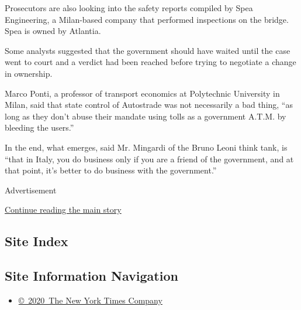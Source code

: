 Prosecutors are also looking into the safety reports compiled by Spea
Engineering, a Milan-based company that performed inspections on the
bridge. Spea is owned by Atlantia.

Some analysts suggested that the government should have waited until the
case went to court and a verdict had been reached before trying to
negotiate a change in ownership.

Marco Ponti, a professor of transport economics at Polytechnic
University in Milan, said that state control of Autostrade was not
necessarily a bad thing, ``as long as they don't abuse their mandate
using tolls as a government A.T.M. by bleeding the users.''

In the end, what emerges, said Mr. Mingardi of the Bruno Leoni think
tank, is ``that in Italy, you do business only if you are a friend of
the government, and at that point, it's better to do business with the
government.''

Advertisement

\protect\hyperlink{after-bottom}{Continue reading the main story}

\hypertarget{site-index}{%
\subsection{Site Index}\label{site-index}}

\hypertarget{site-information-navigation}{%
\subsection{Site Information
Navigation}\label{site-information-navigation}}

\begin{itemize}
\tightlist
\item
  \href{https://help.nytimes3xbfgragh.onion/hc/en-us/articles/115014792127-Copyright-notice}{©~2020~The
  New York Times Company}
\end{itemize}

